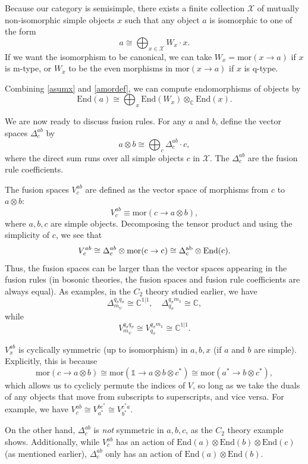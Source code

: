 \documentclass[12pt,a4paper]{article}
\newcounter{arrow}
\newcommand{\tp}{\otimes}
\newcommand{\ra}{\rightarrow}
\newcommand{\unit}{\mathds{1}}
\newcommand{\cc}{\mathbb{C}}
\newcommand{\mcx}{\mathcal{X}}
\newcommand\be            {\begin{equation}}
\newcommand\ee            {\end{equation}}
\newcommand{\mor}{\text{mor}}
\newcommand{\End}{\text{End}}
\begin{document}
Because our category is semisimple, there exists a finite collection $\mcx$ of mutually non-isomorphic simple objects $x$ such
that any object $a$ is isomorphic to one of the form
\be \label{asumx}
	a \cong \bigoplus_{x\in \mcx} W_x\cdot x .
\ee
If we want the isomorphism to be canonical, we can take $W_x = \mor(x\to a)$ if $x$ is m-type, or $W_x$ to be the even morphisms in $\mor(x\to a)$
if $x$ is q-type.

Combining \eqref{asumx} and \eqref{amordef}, we can compute endomorphisms of objects by
\be
	\End(a) \cong \bigoplus_x \End(W_x) \otimes_\cc \End(x).
\ee

We are now ready to discuss fusion rules. 
For any $a$ and $b$, define the vector spaces $\Delta^{ab}_c$ by
\be
	a \otimes b \cong \bigoplus_c \Delta^{ab}_c \cdot c ,
\ee
where the direct sum runs over all simple objects $c$ in $\mcx$. 
The $\Delta^{ab}_c$ are the fusion rule coefficients. 

The fusion spaces $V^{ab}_c$ are defined as the vector space of morphisms from $c$ to $a\tp b$:
\be \label{defn_of_V_by_Delta}
	V^{ab}_c \equiv \mor(c \to a\tp b),
\ee
where $a,b,c$ are simple objects. 
Decomposing the tensor product and using the simplicity of $c$, we see that 
\be V^{ab}_c \cong \Delta^{ab}_c \tp \rm{mor}(c \ra c) \cong \Delta^{ab}_c \otimes \End(c).\ee
Thus, the fusion spaces can be larger than the vector spaces appearing in the fusion rules 
(in bosonic theories, the fusion spaces and fusion rule coefficients are always equal).
As examples, in the $C_2$ theory studied earlier, we have 
\be \Delta^{q_\sigma q_\sigma}_{m_\psi} \cong \cc^{1|1},\quad\Delta^{q_\sigma m_\unit}_{q_\sigma} \cong \cc,\ee
while 
\be V^{q_\sigma q_\sigma}_{m_\psi} \cong V^{q_\sigma m_\unit}_{q_\sigma} \cong \cc^{1|1}.\ee

$V^{ab}_x$ is cyclically symmetric (up to isomorphism) in $a,b,x$ (if $a$ and $b$ are simple).
Explicitly, this is because 
\be \mor(c \ra a\tp b) \cong \mor(\unit \ra a\tp b \tp c^*) \cong \mor(a^* \ra b\tp c^*),\ee 
which allows us to cyclicly permute the indices of $V$, so long as we take the duals of any objects that move from subscripts to superscripts, and vice versa. 
For example, we have $V^{ab}_c \cong V^{bc^*}_{a^*} \cong V^{c^*a}_{b^*}$. 

On the other hand, $\Delta^{ab}_c$ is {\it not} symmetric in $a,b,c$, as the $C_2$ theory example shows. 
Additionally, while $V^{ab}_c$ has an action of $\End(a)\otimes\End(b)\otimes\End(c)$ (as mentioned earlier), $\Delta^{ab}_c$
only has an action of $\End(a)\otimes\End(b)$.
\end{document}
